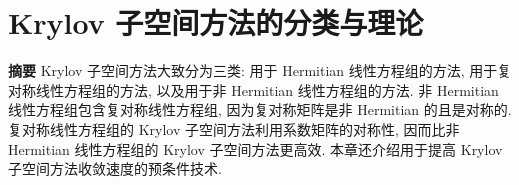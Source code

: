 \clearpage\section{{Krylov 子空间方法的分类与理论}}\label{chap:krylov-classification}\label{srcpage:printed-73}
\setcounter{footnote}{0}
\noindent\textbf{{摘要}}\quad
{Krylov 子空间方法大致分为三类: 用于 Hermitian 线性方程组的方法, 用于复对称线性方程组的方法, 以及用于非 Hermitian 线性方程组的方法. 非 Hermitian 线性方程组包含复对称线性方程组, 因为复对称矩阵是非 Hermitian 的且是对称的. 复对称线性方程组的 Krylov 子空间方法利用系数矩阵的对称性, 因而比非 Hermitian 线性方程组的 Krylov 子空间方法更高效. 本章还介绍用于提高 Krylov 子空间方法收敛速度的预条件技术.}
